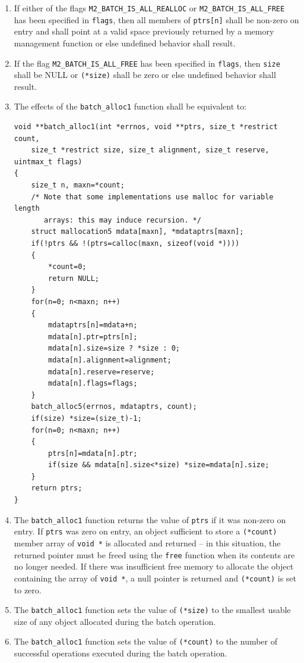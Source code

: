 \documentclass[wd]{isov2}
\begin{document}
{\begin{enumerate}
\item If either of the flags \texttt{M2\_BATCH\_IS\_ALL\_REALLOC} or \texttt{M2\_BATCH\_IS\_ALL\_FREE} has been specified in \texttt{flags}, then all members of \texttt{ptrs[n]} shall be non-zero on entry and shall point at a valid space previously returned by a memory management function or else undefined behavior shall result.
\item If the flag \texttt{M2\_BATCH\_IS\_ALL\_FREE} has been specified in \texttt{flags}, then \texttt{size} shall be NULL or \texttt{(*size)} shall be zero or else undefined behavior shall result.
\item The effects of the \texttt{batch\_alloc1} function shall be equivalent to:

\begin{verbatim}
void **batch_alloc1(int *errnos, void **ptrs, size_t *restrict count,
    size_t *restrict size, size_t alignment, size_t reserve, uintmax_t flags)
{
    size_t n, maxn=*count;
    /* Note that some implementations use malloc for variable length
       arrays: this may induce recursion. */
    struct mallocation5 mdata[maxn], *mdataptrs[maxn];
    if(!ptrs && !(ptrs=calloc(maxn, sizeof(void *))))
    {
        *count=0;
        return NULL;
    }
    for(n=0; n<maxn; n++)
    {
        mdataptrs[n]=mdata+n;
        mdata[n].ptr=ptrs[n];
        mdata[n].size=size ? *size : 0;
        mdata[n].alignment=alignment;
        mdata[n].reserve=reserve;
        mdata[n].flags=flags;
    }
    batch_alloc5(errnos, mdataptrs, count);
    if(size) *size=(size_t)-1;
    for(n=0; n<maxn; n++)
    {
        ptrs[n]=mdata[n].ptr;
        if(size && mdata[n].size<*size) *size=mdata[n].size;
    }
    return ptrs;
}
\end{verbatim}
\item The \texttt{batch\_alloc1} function returns the value of \texttt{ptrs} if it was non-zero on entry. If \texttt{ptrs} was zero on entry, an object sufficient to store a \texttt{(*count)} member array of \texttt{void *} is allocated and returned -- in this situation, the returned pointer must be freed using the \texttt{free} function when its contents are no longer needed. If there was insufficient free memory to allocate the object containing the array of \texttt{void *}, a null pointer is returned and \texttt{(*count)} is set to zero.
\item The \texttt{batch\_alloc1} function sets the value of \texttt{(*size)} to the smallest usable size of any object allocated during the batch operation.
\item The \texttt{batch\_alloc1} function sets the value of \texttt{(*count)} to the number of successful operations executed during the batch operation.
\end{enumerate}

}
\end{document}
